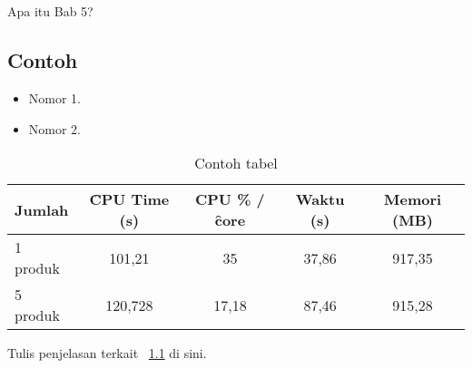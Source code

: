 \chapter{\babLima}
Apa itu Bab 5?


\section{Contoh}
\begin{itemize}
	\item Nomor 1.
	\item Nomor 2.
\end{itemize}

\begin{table}
	\centering
	\begin{tabular}{|l|c|c|c|c|}
		\hline
		Jumlah   & \f{CPU Time} (s) & CPU \% / \f{core} & Waktu (s) & Memori (MB) \\ \hline
		1 produk & 101,21           & 35                & 37,86     & 917,35      \\ \hline
		5 produk & 120,728          & 17,18             & 87,46     & 915,28      \\ \hline
	\end{tabular}
	\caption{Contoh tabel}
	\label{table:sample}
\end{table}

Tulis penjelasan terkait \tab~\ref{table:sample} di sini.
